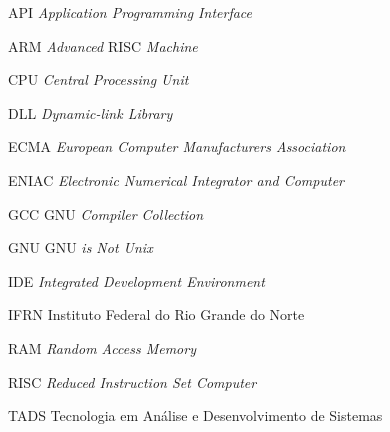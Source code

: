 %
%
%
%

\begin{siglas}
\OnehalfSpacing
  \item[API] \textit{Application Programming Interface}
  \item[ARM] \textit{Advanced} RISC \textit{Machine}
  \item[CPU] \textit{Central Processing Unit}
  \item[DLL] \textit{Dynamic-link Library}
  \item[ECMA] \textit{European Computer Manufacturers Association}
  \item[ENIAC] \textit{Electronic Numerical Integrator and Computer}
  \item[GCC] GNU \textit{Compiler Collection}
  \item[GNU] GNU \textit{is Not Unix}
  \item[IDE] \textit{Integrated Development Environment}
  \item[IFRN] Instituto Federal do Rio Grande do Norte
  \item[RAM] \textit{Random Access Memory}
  \item[RISC] \textit{Reduced Instruction Set Computer}
  \item[TADS] Tecnologia em Análise e Desenvolvimento de Sistemas
\end{siglas}
